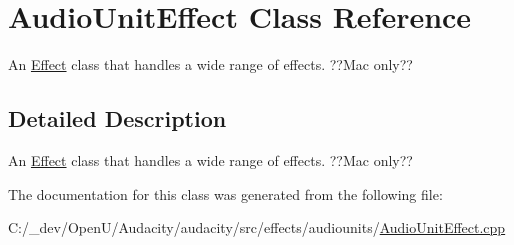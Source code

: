\hypertarget{class_audio_unit_effect}{}\section{Audio\+Unit\+Effect Class Reference}
\label{class_audio_unit_effect}


An \hyperlink{class_effect}{Effect} class that handles a wide range of effects. ??Mac only??  




\subsection{Detailed Description}
An \hyperlink{class_effect}{Effect} class that handles a wide range of effects. ??Mac only?? 

The documentation for this class was generated from the following file\+:\begin{DoxyCompactItemize}
\item 
C\+:/\+\_\+dev/\+Open\+U/\+Audacity/audacity/src/effects/audiounits/\hyperlink{_audio_unit_effect_8cpp}{Audio\+Unit\+Effect.\+cpp}\end{DoxyCompactItemize}
